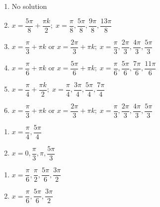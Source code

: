 \begin{enumerate}
\item No solution

\item $x = \dfrac{5\pi}{8} + \dfrac{\pi k}{2}; \; x = \dfrac{\pi}{8}, \dfrac{5\pi}{8}, \dfrac{9\pi}{8}, \dfrac{13\pi}{8}$

\item $x = \dfrac{\pi}{3} + \pi k$ or $x = \dfrac{2\pi}{3} + \pi k; \; x = \dfrac{\pi}{3}, \dfrac{2\pi}{3}, \dfrac{4\pi}{3}, \dfrac{5\pi}{3}$

\item $x = \dfrac{\pi}{6} + \pi k$ or $x = \dfrac{5\pi}{6} + \pi k; \; x = \dfrac{\pi}{6}, \dfrac{5\pi}{6}, \dfrac{7\pi}{6}, \dfrac{11\pi}{6}$

\item $x = \dfrac{\pi}{4} + \dfrac{\pi k}{2}; \; x = \dfrac{\pi}{4}, \dfrac{3\pi}{4}, \dfrac{5\pi}{4}, \dfrac{7\pi}{4}$

\item $x = \dfrac{\pi}{3} + \pi k$ or $x = \dfrac{2\pi}{3} + \pi k; \; x = \dfrac{\pi}{3}, \dfrac{2\pi}{3}, \dfrac{4\pi}{3}, \dfrac{5\pi}{3}$

\setcounter{HW}{\value{enumi}}

\end{enumerate}

\begin{multicols}{2}

\begin{enumerate}

\setcounter{enumi}{\value{HW}}

\item $x = \dfrac{\pi}{4}, \dfrac{5\pi}{4}$
\item $x = 0, \dfrac{\pi}{3}, \pi, \dfrac{5\pi}{3}$

\setcounter{HW}{\value{enumi}}

\end{enumerate}

\end{multicols}

\begin{multicols}{2}

\begin{enumerate}

\setcounter{enumi}{\value{HW}}

\item $x = \dfrac{\pi}{6}, \dfrac{\pi}{2}, \dfrac{5\pi}{6}, \dfrac{3\pi}{2}$
\item $x = \dfrac{\pi}{6}, \dfrac{5\pi}{6}, \dfrac{3\pi}{2}$

\setcounter{HW}{\value{enumi}}

\end{enumerate}

\end{multicols}

